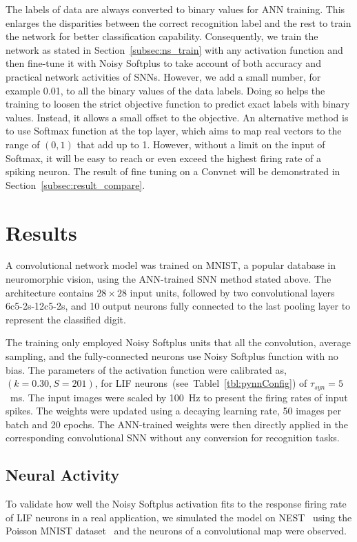 	The labels of data are always converted to binary values for ANN training.
	This enlarges the disparities between the correct recognition label and the rest to train the network for better classification capability.
	Consequently, we train the network as stated in Section~\ref{subsec:ns_train} with any activation function and then fine-tune it with Noisy Softplus to take account of both accuracy and practical network activities of SNNs.
	However, we add a small number, for example 0.01, to all the binary values of the data labels.
	Doing so helps the training to loosen the strict objective function to predict exact labels with binary values.
	Instead, it allows a small offset to the objective.
	An alternative method is to use Softmax function at the top layer, which aims to map real vectors to the range of $(0,1)$ that add up to 1. 
	However, without a limit on the input of Softmax, it will be easy to reach or even exceed the highest firing rate of a spiking neuron.
	The result of fine tuning on a Convnet will be demonstrated in Section~\ref{subsec:result_compare}.
	
	
\section{Results}
\label{sec:iconipResult}
	A convolutional network model was trained on MNIST,
	a popular database in neuromorphic vision, using the ANN-trained SNN method stated above.
	The architecture contains $28\times28$ input units, followed by two convolutional layers 6c5-2s-12c5-2s, and 10 output neurons fully connected to the last pooling layer to represent the classified digit.
	
	The training only employed Noisy Softplus units that all the convolution, average sampling, and the fully-connected neurons use Noisy Softplus function with no bias.
	The parameters of the activation function were calibrated as, $(k=0.30, S=201)$,  for LIF neurons~(see~Tablel~\ref{tbl:pynnConfig}) of $\tau_{syn}=5$~ms.
	The input images were scaled by 100~Hz to present the firing rates of input spikes.
	The weights were updated using a decaying learning rate, 50 images per batch and 20 epochs.
	The ANN-trained weights were then directly applied in the corresponding convolutional SNN without any conversion for recognition tasks.
	
	
	\subsection{Neural Activity}
	To validate how well the Noisy Softplus activation fits to the response firing rate of LIF neurons in a real application, we simulated the model on NEST~\cite{gewaltig2007nest} using the Poisson MNIST dataset~\cite{liu2016bench} and the neurons of a convolutional map were observed.
	
